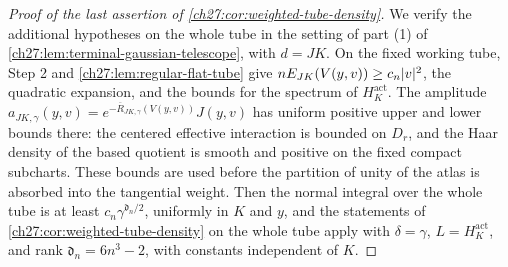 \begin{proof}[Proof of the last assertion of \cref{ch27:cor:weighted-tube-density}]
We verify the additional hypotheses on the whole tube in the setting of part (1) of \cref{ch27:lem:terminal-gaussian-telescope}, with $d=JK$. On the fixed working tube, Step 2 and \cref{ch27:lem:regular-flat-tube} give $nE_{JK}(V(y,v))\ge c_n\lvert v\rvert^2$, the quadratic expansion, and the bounds for the spectrum of $H_K^{\mathrm{act}}$. The amplitude $a_{JK,\gamma}(y,v)=e^{-\overline R_{JK,\gamma}(V(y,v))}J(y,v)$ has uniform positive upper and lower bounds there: the centered effective interaction is bounded on $D_r$, and the Haar density of the based quotient is smooth and positive on the fixed compact subcharts. These bounds are used before the partition of unity of the atlas is absorbed into the tangential weight. Then the normal integral over the whole tube is at least $c_n\gamma^{\mathfrak d_n/2}$, uniformly in $K$ and $y$, and the statements of \cref{ch27:cor:weighted-tube-density} on the whole tube apply with $\delta=\gamma$, $L=H_K^{\mathrm{act}}$, and rank $\mathfrak d_n=6n^3-2$, with constants independent of $K$.
\end{proof}

